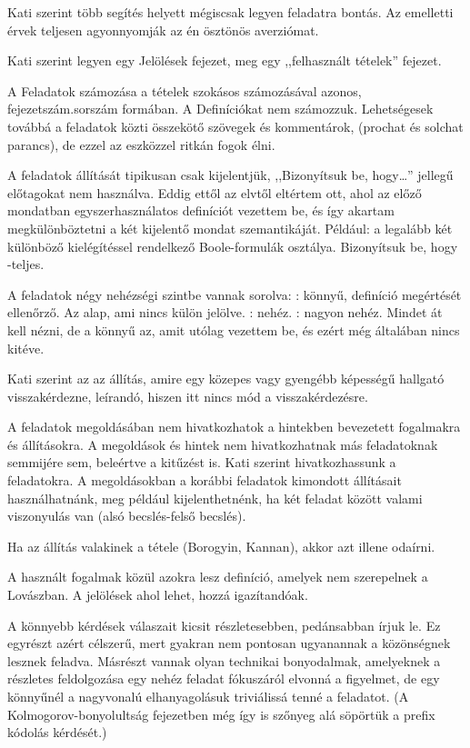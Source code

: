 Kati szerint több segítés helyett mégiscsak legyen feladatra bontás. Az emelletti érvek teljesen agyonnyomják az én ösztönös averziómat.

Kati szerint legyen egy Jelölések fejezet, meg egy ,,felhasznált tételek'' fejezet.

A Feladatok számozása a tételek szokásos számozásával azonos, fejezetszám.sorszám formában. A Definíciókat nem számozzuk. Lehetségesek továbbá a feladatok közti összekötő szövegek és kommentárok, (prochat és solchat parancs), de ezzel az eszközzel ritkán fogok élni.

A feladatok állítását tipikusan csak kijelentjük, ,,Bizonyítsuk be, hogy\ldots'' jellegű előtagokat nem használva. Eddig ettől az elvtől eltértem ott, ahol az előző mondatban egyszerhasználatos definíciót vezettem be, és így akartam megkülönböztetni a két kijelentő mondat szemantikáját. Például:  a legalább két különböző kielégítéssel rendelkező Boole-formulák
osztálya. Bizonyítsuk be, hogy  \NP-teljes.

A feladatok négy nehézségi szintbe vannak sorolva: \easy : könnyű, definíció megértését ellenőrző. Az alap, ami nincs külön jelölve. \hard : nehéz. \veryhard : nagyon nehéz. Mindet át kell nézni, de a könnyű az, amit utólag vezettem be, és ezért még általában nincs kitéve.

Kati szerint az az állítás, amire egy közepes vagy gyengébb képességű hallgató visszakérdezne, leírandó, hiszen itt nincs mód a visszakérdezésre.

A feladatok megoldásában nem hivatkozhatok a hintekben bevezetett fogalmakra és állításokra. A megoldások és hintek nem hivatkozhatnak más feladatoknak semmijére sem, beleértve a kitűzést is. Kati szerint hivatkozhassunk a feladatokra. A megoldásokban a korábbi feladatok kimondott állításait használhatnánk, meg például kijelenthetnénk, ha két feladat között valami viszonyulás van (alsó becslés-felső becslés).

Ha az állítás valakinek a tétele (Borogyin, Kannan), akkor azt illene odaírni.

A használt fogalmak közül azokra lesz definíció, amelyek nem szerepelnek a Lovászban. A jelölések ahol lehet, hozzá igazítandóak.

A könnyebb kérdések válaszait kicsit részletesebben, pedánsabban írjuk le. Ez egyrészt azért célszerű, mert gyakran nem pontosan ugyanannak a közönségnek lesznek feladva. Másrészt vannak olyan technikai bonyodalmak, amelyeknek a részletes feldolgozása egy nehéz feladat fókuszáról elvonná a figyelmet, de egy könnyűnél a nagyvonalú elhanyagolásuk triviálissá tenné a feladatot. (A Kolmogorov-bonyolultság fejezetben még így is szőnyeg alá söpörtük a prefix kódolás kérdését.)

